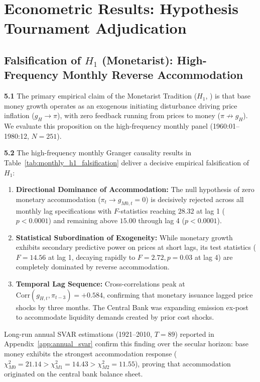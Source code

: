 \section{Econometric Results: Hypothesis Tournament Adjudication}
\label{sec:results_discussion}

\subsection{Falsification of \texorpdfstring{$H_1$}{H1} (Monetarist): High-Frequency Monthly Reverse Accommodation}
\label{sec:results_gate1}

\textbf{5.1} The primary empirical claim of the Monetarist Tradition ($H_1$, \citealp{Edwards2024}) is that base money growth operates as an exogenous initiating disturbance driving price inflation ($g_H \to \pi$), with zero feedback running from prices to money ($\pi \not\to g_H$). We evaluate this proposition on the high-frequency monthly panel (1960:01--1980:12, $N=251$).



\textbf{5.2} The high-frequency monthly Granger causality results in Table~\ref{tab:monthly_h1_falsification} deliver a decisive empirical falsification of $H_1$:
\begin{enumerate}[leftmargin=2em]
	\item \textbf{Directional Dominance of Accommodation:} The null hypothesis of zero monetary accommodation ($\pi_t \to g_{M0,t} = 0$) is decisively rejected across all monthly lag specifications with $F$-statistics reaching $28.32$ at lag 1 ($p < 0.0001$) and remaining above $15.00$ through lag 4 ($p < 0.0001$).
	\item \textbf{Statistical Subordination of Exogeneity:} While monetary growth exhibits secondary predictive power on prices at short lags, its test statistics ($F = 14.56$ at lag 1, decaying rapidly to $F = 2.72, p = 0.03$ at lag 4) are completely dominated by reverse accommodation.
	\item \textbf{Temporal Lag Sequence:} Cross-correlations peak at $\text{Corr}(g_{H,t}, \pi_{t-3}) = +0.584$, confirming that monetary issuance lagged price shocks by three months. The Central Bank was expanding emission ex-post to accommodate liquidity demands created by prior cost shocks.
\end{enumerate}
Long-run annual SVAR estimations (1921--2010, $T=89$) reported in Appendix~\ref{app:annual_svar} confirm this finding over the secular horizon: base money exhibits the strongest accommodation response ($\chi^2_{M0} = 21.14 > \chi^2_{M1} = 14.43 > \chi^2_{M2} = 11.55$), proving that accommodation originated on the central bank balance sheet.

